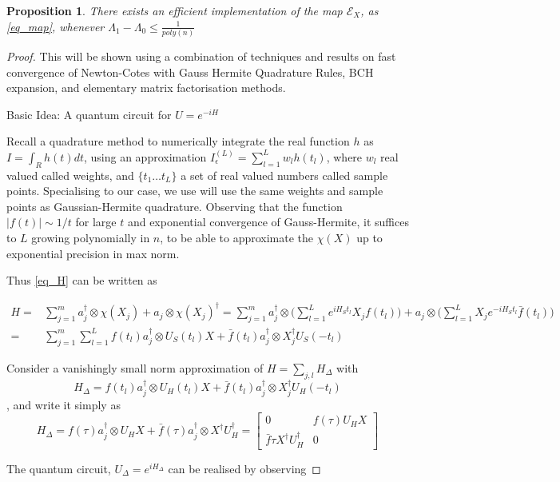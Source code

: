 \documentclass[10pt]{amsart}
\newtheorem{proposition}{Proposition}
\newcommand{\EE}{{\mathcal E}}
\begin{document}
\begin{proposition}
There exists an efficient implementation of the map $\EE_X$, as \eqref{eq_map}, whenever $\Lambda_1-\Lambda_0 \leq \frac{1}{poly(n)}$
\end{proposition}
\begin{proof}
    This will be shown using a combination of techniques and results on fast convergence of Newton-Cotes with Gauss Hermite Quadrature Rules, BCH expansion, and elementary matrix factorisation methods.

    Basic Idea: A quantum circuit for $U = e^{-iH}$

Recall a quadrature method to numerically integrate the real function $h$ as $I = \int_R h(t) dt$, using an approximation $I_{\epsilon}^{(L)} = \sum_{l=1}^L w_l h(t_l)$, where $w_l$ real valued called weights, and $\{t_1 \ldots t_L\}$ a set of real valued numbers called sample points. 
Specialising to our case, we use will use the same weights and sample points as  
Gaussian-Hermite quadrature. Observing that the function $|f(t)| \sim 1/t$ for large $t$ and exponential convergence of Gauss-Hermite, it suffices to $L$ growing polynomially in $n$, to be able to approximate the $\chi(X)$ up to exponential precision in max norm.

Thus \ref{eq_H} can be written as

\begin{align}
\label{eq_Hexpansion}
    H = & \sum_{j=1}^m a^{\dagger}_j \otimes \chi(X_j) + a_j \otimes \chi(X_j)^{\dagger} = \sum_{j=1}^m a^{\dagger}_j \otimes \big(\sum_{l=1}^L e^{iH_S t_l}X_jf(t_l) \big) + a_j \otimes \big(\sum_{l=1}^L X_je^{-iH_S t_l}\bar{f}(t_l) \big)  \\
     = & \sum_{j=1}^m \sum_{l=1}^L f(t_l)a^{\dagger}_j\otimes U_S(t_l)X + \bar{f}(t_l)a^{\dagger}_j\otimes X_j^{\dagger}U_S(-t_l)
\end{align}

Consider a vanishingly small norm approximation of $H = \sum_{j,l} H_\Delta$ with
$$H_{\Delta} = f(t_l)a^{\dagger}_j\otimes U_H(t_l)X + \bar{f}(t_l)a^{\dagger}_j\otimes X_j^{\dagger}U_H(-t_l)$$, and write it simply as $$H_{\Delta} = f(\tau)a^{\dagger}_j\otimes U_HX + \bar{f}(\tau)a^{\dagger}_j\otimes X^{\dagger} U_H^{\dagger} = \begin{bmatrix}
0 & f(\tau) U_H X \\
\bar{f}{\tau} X^{\dagger}U_H^{\dagger} & 0
\end{bmatrix}$$

The quantum circuit, $U_{\Delta} = e^{iH_\Delta}$ can be realised by observing 


\end{proof}
\end{document}
